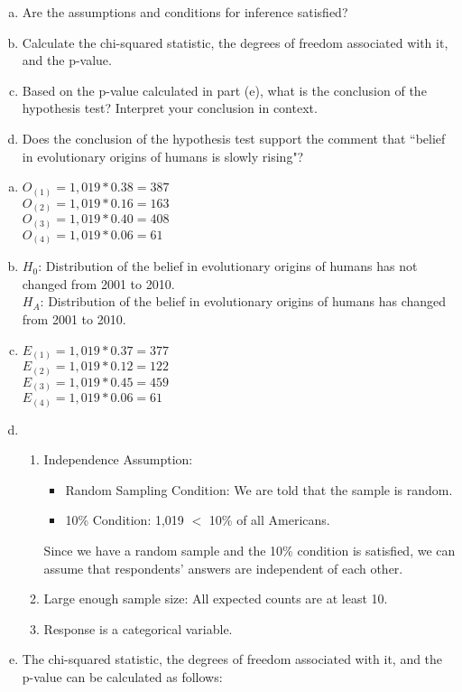{{\begin{enumerate}[(a)]
\item Are the assumptions and conditions for inference satisfied?
\item Calculate the chi-squared statistic, the degrees of freedom associated with it, and the p-value.
\item Based on the p-value calculated in part (e), what is the conclusion of the hypothesis test? Interpret your conclusion in context. 
\item Does the conclusion of the hypothesis test support the comment that ``belief in evolutionary origins of humans is slowly rising"?
\end{enumerate}
}
{
\begin{enumerate}[(a)]
\item $O_{(1)} = 1,019 * 0.38 = 387$ \\
$O_{(2)} = 1,019 * 0.16 = 163$ \\
$O_{(3)} = 1,019 * 0.40= 408$ \\
$O_{(4)} = 1,019 * 0.06 = 61$
\item $H_0$: Distribution of the belief in evolutionary origins of humans has not changed from 2001 to 2010. \\
$H_A$: Distribution of the belief in evolutionary origins of humans has changed from 2001 to 2010.
\item  $E_{(1)} = 1,019 * 0.37 = 377$ \\
$E_{(2)} = 1,019 * 0.12 = 122$ \\
$E_{(3)} = 1,019 * 0.45= 459$ \\
$E_{(4)} = 1,019 * 0.06 = 61$
\item \begin{enumerate}[1.]
\item Independence Assumption: 
\begin{itemize}
\item Random Sampling Condition: We are told that the sample is random.
\item 10\% Condition: 1,019 $<$ 10\% of all Americans.
\end{itemize}
Since we have a random sample and the 10\% condition is satisfied, we can assume that respondents' answers are independent of each other.
\item Large enough sample size: All expected counts are at least 10.
\item Response is a categorical variable.
\end{enumerate}
\item The chi-squared statistic, the degrees of freedom associated with it, and the p-value can be calculated as follows:

\end{enumerate}}}
